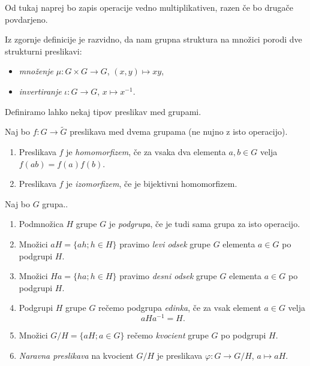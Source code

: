 \documentclass[mat1]{fmfdelo}
\begin{document}
\begin{opomba}
Od tukaj naprej bo zapis operacije vedno multiplikativen, razen če bo drugače povdarjeno.
\end{opomba}

Iz zgornje definicije je razvidno, da nam grupna struktura na množici porodi dve strukturni preslikavi:
\begin{itemize}
\item \emph{množenje} $\mu\colon G \times G \to G$, $(x, y) \mapsto xy$,
\item \emph{invertiranje} $\iota\colon G \to G$, $x \mapsto x^{-1}$.
\end{itemize}

Definiramo lahko nekaj tipov preslikav med grupami.

\begin{definicija}\label{def:algpreslikave}
Naj bo $f: G \to \widetilde{G}$ preslikava med dvema grupama (ne nujno z isto operacijo).
\begin{enumerate}
\item Preslikava $f$ je \emph{homomorfizem}, če za vsaka dva elementa $a, b \in G$ velja $f(ab) = f(a)f(b)$.
\item Preslikava $f$ je \emph{izomorfizem}, če je bijektivni homomorfizem.
\end{enumerate}
\end{definicija}

\begin{definicija}\label{def:podgrupa}
Naj bo $G$ grupa..
\begin{enumerate}
\item Podmnožica $H$ grupe $G$ je \emph{podgrupa}, če je tudi sama grupa za isto operacijo.
\item Množici $aH = \lbrace ah ; h \in H \rbrace$ pravimo \emph{levi odsek} grupe $G$ elementa $a \in G$ po podgrupi $H$.
\item Množici $Ha = \lbrace ha ; h \in H \rbrace$ pravimo \emph{desni odsek} grupe $G$ elementa $a \in G$ po podgrupi $H$.
\item Podgrupi $H$ grupe $G$ rečemo podgrupa \emph{edinka}, če za vsak element $a \in G$ velja \[aHa^{-1} = H.\]
\item Množici $G/H = \lbrace aH ; a \in G \rbrace$ rečemo \emph{kvocient} grupe $G$ po podgrupi $H$.
\item \emph{Naravna preslikava} na kvocient $G/H$ je preslikava $\varphi: G \to G/H$, $a \mapsto aH$.
\end{enumerate}
\end{definicija}
\end{document}
